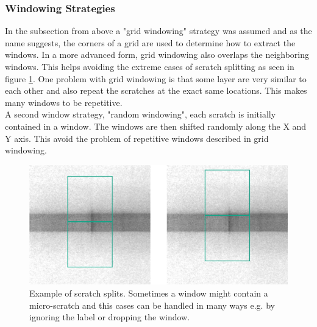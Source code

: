 \subsubsection{Windowing Strategies}
In the subsection from above a "grid windowing" strategy was assumed and as the name suggests, the corners of a grid are used to determine how to extract the windows. In a more advanced form, grid windowing also overlaps the neighboring windows. This helps avoiding the extreme cases of scratch splitting as seen in figure \ref{impl:scratch_splits}. One problem with grid windowing is that some layer are very similar to each other and also repeat the scratches at the exact same locations. This makes many windows to be repetitive.\\
A second window strategy, "random windowing", each scratch is initially contained in a window. The windows are then shifted randomly along the X and Y axis. This avoid the problem of repetitive windows described in grid windowing. \\
\begin{figure}[!h]
  \includegraphics[width=\textwidth]{images/implementation/splits/scratch_splits}
  \centering
  \caption{Example of scratch splits. Sometimes a window might contain a micro-scratch and this cases can be handled in many ways e.g. by ignoring the label or dropping the window.}
  \label{impl:scratch_splits}
\end{figure}

